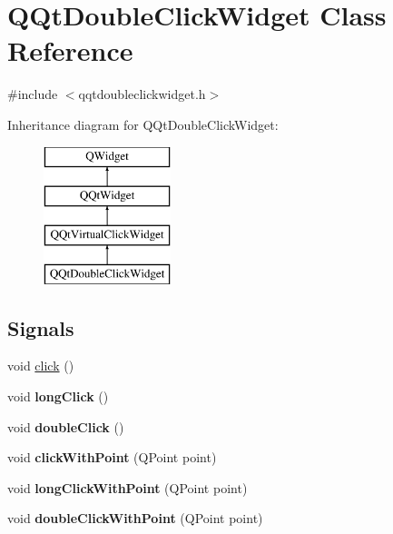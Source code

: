\hypertarget{class_q_qt_double_click_widget}{}\section{Q\+Qt\+Double\+Click\+Widget Class Reference}
\label{class_q_qt_double_click_widget}


{\ttfamily \#include $<$qqtdoubleclickwidget.\+h$>$}

Inheritance diagram for Q\+Qt\+Double\+Click\+Widget\+:\begin{figure}[H]
\begin{center}
\leavevmode
\includegraphics[height=4.000000cm]{class_q_qt_double_click_widget}
\end{center}
\end{figure}
\subsection*{Signals}
\begin{DoxyCompactItemize}
\item 
void \mbox{\hyperlink{class_q_qt_double_click_widget_a045d2a46343284bb5f7e7d05c5187af5}{click}} ()
\item 
\mbox{\label{class_q_qt_double_click_widget_abc261840e1736311873eee721d8da691}} 
void {\bfseries long\+Click} ()
\item 
\mbox{\label{class_q_qt_double_click_widget_a20de27532d70a53bfeff24480adecf42}} 
void {\bfseries double\+Click} ()
\item 
\mbox{\label{class_q_qt_double_click_widget_a38d5e2ea02b68e93ea4058628ebc5985}} 
void {\bfseries click\+With\+Point} (Q\+Point point)
\item 
\mbox{\label{class_q_qt_double_click_widget_a2224cf5d63689df0399678eae05f4941}} 
void {\bfseries long\+Click\+With\+Point} (Q\+Point point)
\item 
\mbox{\label{class_q_qt_double_click_widget_ad5b403cc6e8bd03c8c335c79f12508f8}} 
void {\bfseries double\+Click\+With\+Point} (Q\+Point point)
\end{DoxyCompactItemize}
